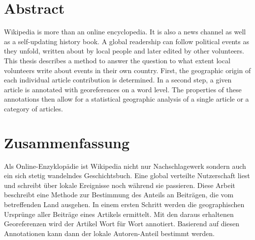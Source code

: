 \begingroup
\let\clearpage\relax
\let\cleardoublepage\relax
\let\cleardoublepage\relax

\chapter*{Abstract}

Wikipedia is more than an online encyclopedia. 
It is also a news channel as well as a self-updating history book.
A global readership can follow political events as they unfold, written about by local people and later edited by other volunteers.
This thesis describes a method to answer the question to what extent local volunteers write about events in their own country.
First, the geographic origin of each individual article contribution is determined.
In a second step, a given article is annotated with georeferences on a word level.
The properties of these annotations then allow for a statistical geographic analysis of a single article or a category of articles.

\vfill

\chapter*{Zusammenfassung}

Als Online-Enzyklopädie ist Wikipedia nicht nur Nachschlagewerk sondern auch ein sich stetig wandelndes Geschichtsbuch. 
Eine global verteilte Nutzerschaft liest und schreibt über lokale Ereignisse noch während sie passieren. 
Diese Arbeit beschreibt eine Methode zur Bestimmung des Anteils an Beitr\"agen, die vom betreffenden Land ausgehen.
In einem ersten Schritt werden die geographischen Urspr\"unge aller Beitr\"age eines Artikels ermittelt.
Mit den daraus erhaltenen Georeferenzen wird der Artikel Wort f\"ur Wort annotiert.
Basierend auf diesen Annotationen kann dann der lokale Autoren-Anteil bestimmt werden.
\endgroup			

\vfill